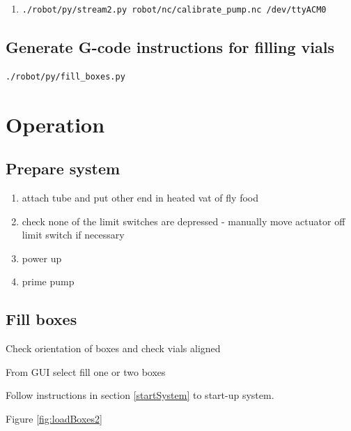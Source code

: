 \documentclass[]{book}
\providecommand{\tightlist}{%
  \setlength{\itemsep}{0pt}\setlength{\parskip}{0pt}}
\theoremstyle{definition}
\theoremstyle{definition}
\theoremstyle{remark}
\begin{document}
\begin{enumerate}
\def\labelenumi{\arabic{enumi}.}
\setcounter{enumi}{3}
\item
\begin{verbatim}
./robot/py/stream2.py robot/nc/calibrate_pump.nc /dev/ttyACM0
\end{verbatim}
\end{enumerate}

\section{Generate G-code instructions for filling
vials}\label{generate-g-code-instructions-for-filling-vials}

\begin{verbatim}
./robot/py/fill_boxes.py
\end{verbatim}

\chapter{Operation}\label{operation}

\section{Prepare system}\label{prepare-system}

\begin{enumerate}
\def\labelenumi{\arabic{enumi}.}
\tightlist
\item
  attach tube and put other end in heated vat of fly food
\item
  check none of the limit switches are depressed - manually move
  actuator off limit switch if necessary
\item
  power up
\item
  prime pump
\end{enumerate}

\section{Fill boxes}\label{fill-boxes}

Check orientation of boxes and check vials aligned

From GUI select fill one or two boxes

Follow instructions in section \ref{startSystem} to start-up system.

Figure \ref{fig:loadBoxes2}
\end{document}
